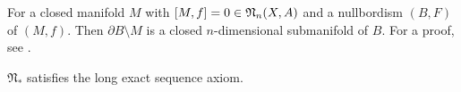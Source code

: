 \documentclass[a4paper,11pt]{article}
\begin{document}


\begin{remark}%
    For a closed manifold \(M\) with \([M,f]=0\in\mathfrak{N}_n(X,A)\) and a nullbordism \((B,F)\) of \((M,f)\). Then \(\partial B\setminus M\) is a closed \(n\)-dimensional submanifold of \(B\). For a proof, see \cite[Lemma 5.4]{zhang}.
\end{remark}

\begin{lemma}\label{les}
    \(\mathfrak{N}_\ast\) satisfies the long exact sequence axiom.
\end{lemma}

\end{document}

